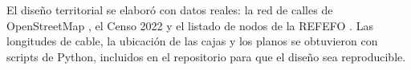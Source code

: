 El diseño territorial se elaboró con datos reales: la red de calles de OpenStreetMap \cite{osm}, el Censo 2022 \cite{indec_censo} y el listado de nodos de la REFEFO \cite{arsat_nodos}. Las longitudes de cable, la ubicación de las cajas y los planos se obtuvieron con scripts de Python, incluidos en el repositorio para que el diseño sea reproducible.
